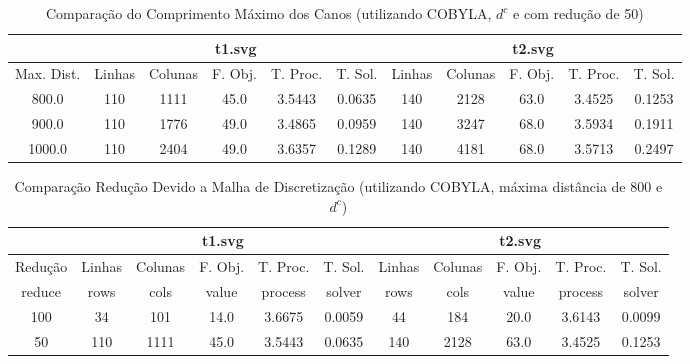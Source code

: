 \begin{landscape}
\begin{table}
    \centering
    \caption{Comparação do Comprimento Máximo dos Canos (utilizando COBYLA,
    $d^c$ e com redução de 50)}
    \label{tab:maxd}
    \begin{tabular}{|c|c|c|c|c|c|c|c|c|c|c|}
        \hline
        & \multicolumn{5}{|c|}{t1.svg} & \multicolumn{5}{|c|}{t2.svg} \\ \hline
        Max. Dist. & Linhas & Colunas & F. Obj. & T. Proc. & T. Sol. & Linhas &
        Colunas & F. Obj. & T. Proc. & T. Sol. \\ \hline
        800.0 & 110 & 1111 & 45.0 & 3.5443 & 0.0635 & 140 & 2128 & 63.0 & 3.4525 & 0.1253 \\ \hline
        900.0 & 110 & 1776 & 49.0 & 3.4865 & 0.0959 & 140 & 3247 & 68.0 & 3.5934 & 0.1911 \\ \hline
        1000.0 & 110 & 2404 & 49.0 & 3.6357 & 0.1289 & 140 & 4181 & 68.0 & 3.5713 & 0.2497 \\ \hline
    \end{tabular}
\end{table}

\begin{table}
    \centering
    \caption{Comparação Redução Devido a Malha de Discretização (utilizando COBYLA, máxima
    distância de 800 e $d^c$)}
    \label{tab:reduce}
    \begin{tabular}{|c|c|c|c|c|c|c|c|c|c|c|}
        \hline
        & \multicolumn{5}{|c|}{t1.svg} & \multicolumn{5}{|c|}{t2.svg} \\ \hline
        Redução & Linhas & Colunas & F. Obj. & T. Proc. & T. Sol. & Linhas &
        Colunas & F. Obj. & T. Proc. & T. Sol. \\ \hline
        reduce & rows & cols & value & process & solver & rows & cols & value &
        process & solver \\ \hline
        100 & 34 & 101 & 14.0 & 3.6675 & 0.0059 & 44 & 184 & 20.0 & 3.6143 & 0.0099 \\ \hline
        50 & 110 & 1111 & 45.0 & 3.5443 & 0.0635 & 140 & 2128 & 63.0 & 3.4525 & 0.1253 \\ \hline
    \end{tabular}
\end{table}
\end{landscape}
